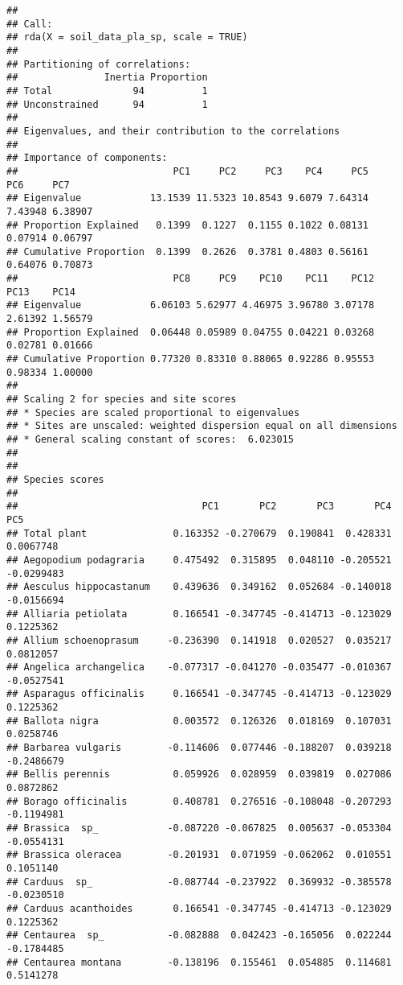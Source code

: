\documentclass[
]{article}
\begin{document}
\begin{verbatim}
## 
## Call:
## rda(X = soil_data_pla_sp, scale = TRUE) 
## 
## Partitioning of correlations:
##               Inertia Proportion
## Total              94          1
## Unconstrained      94          1
## 
## Eigenvalues, and their contribution to the correlations 
## 
## Importance of components:
##                           PC1     PC2     PC3    PC4     PC5     PC6     PC7
## Eigenvalue            13.1539 11.5323 10.8543 9.6079 7.64314 7.43948 6.38907
## Proportion Explained   0.1399  0.1227  0.1155 0.1022 0.08131 0.07914 0.06797
## Cumulative Proportion  0.1399  0.2626  0.3781 0.4803 0.56161 0.64076 0.70873
##                           PC8     PC9    PC10    PC11    PC12    PC13    PC14
## Eigenvalue            6.06103 5.62977 4.46975 3.96780 3.07178 2.61392 1.56579
## Proportion Explained  0.06448 0.05989 0.04755 0.04221 0.03268 0.02781 0.01666
## Cumulative Proportion 0.77320 0.83310 0.88065 0.92286 0.95553 0.98334 1.00000
## 
## Scaling 2 for species and site scores
## * Species are scaled proportional to eigenvalues
## * Sites are unscaled: weighted dispersion equal on all dimensions
## * General scaling constant of scores:  6.023015 
## 
## 
## Species scores
## 
##                                PC1       PC2       PC3       PC4        PC5
## Total plant               0.163352 -0.270679  0.190841  0.428331  0.0067748
## Aegopodium podagraria     0.475492  0.315895  0.048110 -0.205521 -0.0299483
## Aesculus hippocastanum    0.439636  0.349162  0.052684 -0.140018 -0.0156694
## Alliaria petiolata        0.166541 -0.347745 -0.414713 -0.123029  0.1225362
## Allium schoenoprasum     -0.236390  0.141918  0.020527  0.035217  0.0812057
## Angelica archangelica    -0.077317 -0.041270 -0.035477 -0.010367 -0.0527541
## Asparagus officinalis     0.166541 -0.347745 -0.414713 -0.123029  0.1225362
## Ballota nigra             0.003572  0.126326  0.018169  0.107031  0.0258746
## Barbarea vulgaris        -0.114606  0.077446 -0.188207  0.039218 -0.2486679
## Bellis perennis           0.059926  0.028959  0.039819  0.027086  0.0872862
## Borago officinalis        0.408781  0.276516 -0.108048 -0.207293 -0.1194981
## Brassica  sp_            -0.087220 -0.067825  0.005637 -0.053304 -0.0554131
## Brassica oleracea        -0.201931  0.071959 -0.062062  0.010551  0.1051140
## Carduus  sp_             -0.087744 -0.237922  0.369932 -0.385578 -0.0230510
## Carduus acanthoides       0.166541 -0.347745 -0.414713 -0.123029  0.1225362
## Centaurea  sp_           -0.082888  0.042423 -0.165056  0.022244 -0.1784485
## Centaurea montana        -0.138196  0.155461  0.054885  0.114681  0.5141278

\end{verbatim}
\end{document}
